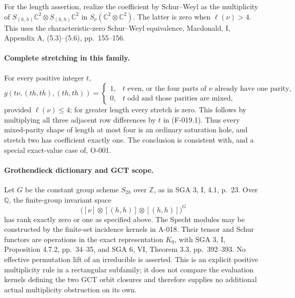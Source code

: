 For the length assertion, realize the coefficient by
Schur--Weyl as the multiplicity of
$S_{(h,h)}\mathbb C^2\otimes S_{(h,h)}\mathbb C^2$
in $S_\nu(\mathbb C^2\otimes\mathbb C^2)$.
The latter is zero when $\ell(\nu)>4$.
This uses the characteristic-zero Schur--Weyl equivalence,
Macdonald, I, Appendix A, (5.3)--(5.6), pp.~155--156.

\paragraph{Complete stretching in this family.}
For every positive integer $t$,
\[
 g(t\nu,(th,th),(th,th))=
 \begin{cases}
 1,&t\text{ even, or the four parts of }\nu
                              \text{ already have one parity},\\
 0,&t\text{ odd and those parities are mixed},
 \end{cases}                                          \tag{F-019.2}
\]
provided $\ell(\nu)\leq4$; for greater length every stretch
is zero. This follows by multiplying all three adjacent
row differences by $t$ in (F-019.1). Thus every mixed-parity
shape of length at most four is an ordinary saturation hole,
and stretch two has coefficient exactly one. The conclusion
is consistent with, and a special exact-value case of, O-001.

\paragraph{Grothendieck dictionary and GCT scope.}
Let $G$ be the constant group scheme $S_{2h}$ over
$\mathbb Z$, as in SGA 3, I, 4.1, p.~23. Over
$\mathbb Q$, the finite-group invariant space
\[
   \bigl([\nu]\otimes[(h,h)]\otimes[(h,h)]\bigr)^G
\]
has rank exactly zero or one as specified above.
The Specht modules may be constructed by the finite-set
incidence kernels in A-018. Their tensor and Schur functors
are operations in the exact representation $K_0$, with
SGA 3, I, Proposition 4.7.2, pp.~34--35, and SGA 6, VI,
Theorem 3.3, pp.~392--393. No effective permutation lift
of an irreducible is asserted. This is an explicit positive
multiplicity rule in a rectangular subfamily; it does not
compare the evaluation kernels defining the two GCT orbit
closures and therefore supplies no additional actual
multiplicity obstruction on its own.
